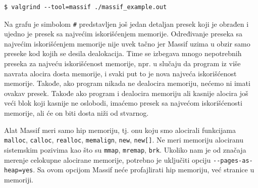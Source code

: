 \begin{verbatim}
$ valgrind --tool=massif ./massif_example.out
\end{verbatim}

Na grafu je simbolom \texttt{\#} predstavljen još jedan detaljan presek koji je obrađen i ujedno je presek sa najvećim iskorišćenjem memorije. Određivanje preseka sa najvećim iskorišćenjem memorije nije uvek tačno jer Massif uzima u obzir samo preseke kod kojih se desila dealokacija. Time se izbegava mnogo nepotrebnih preseka za najveću iskorišćenost memorije, npr. u slučaju da program iz više navrata alocira dosta memorije, i svaki put to je nova najveća iskorišćenost memorije. Takođe, ako program nikada ne dealocira memoriju, nećemo ni imati ovakav presek. Takođe ako program i dealocira memoriju ali kasnije alocira još veći blok koji kasnije ne oslobodi, imaćemo presek sa najvećom iskorišćenosti memorije, ali će on biti dosta niži od stvarnog.

Alat Massif meri samo hip memoriju, tj. onu koju smo alocirali funkcijama \texttt{malloc}, \texttt{calloc}, \texttt{realloc}, \texttt{memalign}, \texttt{new}, \texttt{new{[}{]}}. Ne meri memoriju alociranu sistemskim pozivima kao što su \texttt{mmap}, \texttt{mremap}, \texttt{brk}. Ukoliko nam je od značaja merenje celokupne alocirane memorije, potrebno je uključiti opciju \texttt{-\/-pages-as-heap=yes}. Sa ovom opcijom Massif neće profajlirati hip memoriju, već stranice u memoriji.
